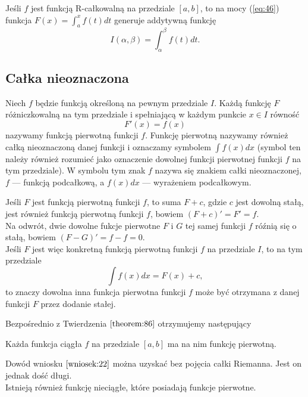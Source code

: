 \documentclass[leqno]{article}
\begin{document}
\begin{justify}
\begin{wniosek}
    Jeśli $f$ jest funkcją R-całkowalną na przedziale $[a,b]$, to na mocy (\ref{eq:46})
    funkcja $F(x) = \int_{a}^{x}f(t)dt$ generuje addytywną funkcję 
    \[
        I(\alpha, \beta) = \int_{\alpha}^{\beta}f(t)dt.
    \]
\end{wniosek}

\subsection{Całka nieoznaczona}

\begin{defn}
    Niech $f$ będzie funkcją określoną na pewnym przedziale $I$. Każdą funkcję $F$ różniczkowalną na tym przedziale
    i spełniającą w każdym punkcie $x \in I$ równość
    \[
        F'(x) = f(x)
    \]
    nazywamy funkcją pierwotną funkcji $f$. Funkcję pierwotną nazywamy również całką
    nieoznaczoną danej funkcji i oznaczamy symbolem $\int f(x)dx$ (symbol ten należy również
    rozumieć jako oznaczenie dowolnej funkcji pierwotnej funkcji $f$ na tym przedziale).
    W symbolu tym znak $f$ nazywa się znakiem całki nieoznaczonej, $f$ --- funkcją podcałkową, a $f(x)dx$ ---
    wyrażeniem podcałkowym.
\end{defn}

\begin{uwaga}
    Jeśli $F$ jest funkcją pierwotną funkcji $f$, to suma $F + c$, gdzie $c$ jest dowolną stałą, jest
    również funkcją pierwotną funkcji $f$, bowiem $(F+c)' = F' = f$. \\
    Na odwrót, dwie dowolne fukcje pierwotne $F$ i $G$ tej samej funkcji $f$ róźnią się o stałą,
    bowiem $(F-G)'= f-f = 0$. \\
    Jeśli $F$ jest więc konkretną funkcją pierwotną funkcji $f$ na przedziale $I$, to na tym przedziale
    \[
        \int f(x)dx = F(x) + c,
    \]
    to znaczy dowolna inna funkcja pierwotna funkcji $f$ może być otrzymana z danej funkcji $F$ przez dodanie stałej.

\end{uwaga}

Bezpośrednio z Twierdzenia $\ref{theorem:86}$ otrzymujemy następujący

\begin{wniosek}
{
    Każda funkcja ciągła $f$ na przedziale $[a,b]$ ma na nim funkcję pierwotną.
}
\end{wniosek}

Dowód wniosku $\ref{wniosek:22}$ można uzyskać bez pojęcia całki Riemanna. Jest on jednak
dość długi. \\
Istnieją również funkcję nieciągłe, które posiadają funkcje pierwotne.


\end{justify}
\end{document}
